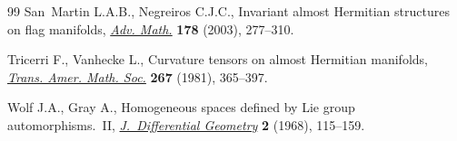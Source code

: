 \begin{thebibliography}{99}
San~Martin L.A.B., Negreiros C.J.C., Invariant almost {H}ermitian structures on
 flag manifolds, \href{https://doi.org/10.1016/S0001-8708(02)00073-7}{\textit{Adv. Math.}} \textbf{178} (2003), 277--310.

Tricerri F., Vanhecke L., Curvature tensors on almost {H}ermitian manifolds,
 \href{https://doi.org/10.2307/1998660}{\textit{Trans. Amer. Math. Soc.}} \textbf{267} (1981), 365--397.

Wolf J.A., Gray A., Homogeneous spaces defined by {L}ie group
 automorphisms.~{II}, \href{https://doi.org/10.4310/jdg/1214428252}{\textit{J.~Differential Geometry}} \textbf{2} (1968),
 115--159.

\end{thebibliography}
